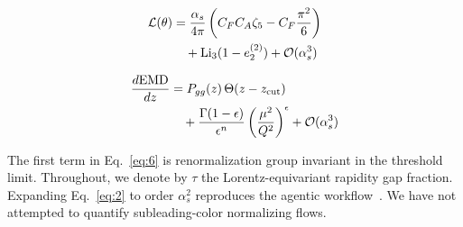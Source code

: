 \begin{align}
  \mathcal{L}(\theta) &= \frac{\alpha_s}{4\pi} \left( C_F C_A \zeta_{5} - C_F \frac{\pi^2}{6} \right) \nonumber \\
  &\quad + \mathrm{Li}_{3}(1 - e_2^{(2)}) + \mathcal{O}(\alpha_s^3) \label{eq:4}
\end{align}

\begin{align}
  \frac{d \mathrm{EMD}}{d z} &= P_{gg}(z) \, \Theta(z - z_{\rm cut}) \nonumber \\
  &\quad + \frac{\Gamma(1-\epsilon)}{\epsilon^{n}} \left(\frac{\mu^2}{Q^2}\right)^{\epsilon} + \mathcal{O}(\alpha_s^3) \label{eq:6}
\end{align}

The first term in Eq.~\eqref{eq:6} is renormalization group invariant in
the threshold limit. Throughout, we denote by $\tau$ the
Lorentz-equivariant rapidity gap fraction. Expanding Eq.~\eqref{eq:2} to
order $\alpha_s^2$ reproduces the agentic
workflow~\cite{TPC:1866-Towards-the-Charged-Particle-Multiplicity-at-Three-Loops-September-22-2026}.
We have not attempted to quantify subleading-color normalizing flows.

